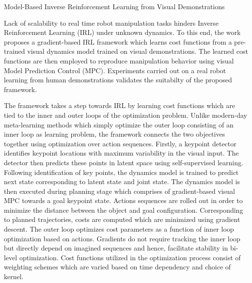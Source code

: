 \documentclass[11pt,letterpaper]{article}
\begin{document}
\begin{center}
  \large{Model-Based Inverse Reinforcement Learning from Visual Demonstrations}
\end{center}

Lack of scalability to real time robot manipulation tasks hinders Inverse Reinforcement Learning (IRL) under unknown dynamics. To this end, the work proposes a gradient-based IRL framework which learns cost functions from a pre-trained visual dynamics model trained on visual demonstrations. The learned cost functions are then employed to reproduce manipulation behavior using visual Model Prediction Control (MPC). Experiments carried out on a real robot learning from human demonstrations validates the suitabilty of the proposed framework.

The framework takes a step towards IRL by learning cost functions which are tied to the inner and outer loops of the optimization problem. Unlike modern-day meta-learning methods which simply optimize the outer loop consisting of an inner loop as learning problem, the framework connects the two objectives together using optimization over action sequences. Firstly, a keypoint detector identifies keypoint locations with maximum variability in the visual input. The detector then predicts these points in latent space using self-supervised learning. Following identification of key points, the dynamics model is trained to predict next state corresponding to latent state and joint state. The dynamics model is then executed during planning stage which comprises of gradient-based visual MPC towards a goal keypoint state. Actions sequences are rolled out in order to minimize the distance between the object and goal configuration. Corresponding to planned trajectories, costs are computed which are minimized using gradient descent. The outer loop optimizes cost parameters as a function of inner loop optimization based on actions. Gradients do not require tracking the inner loop but directly depend on imagined sequences and hence, facilitate stability in bi-level optimization. Cost functions utilized in the optimization process consist of weighting schemes which are varied based on time dependency and choice of kernel. 
\end{document}
